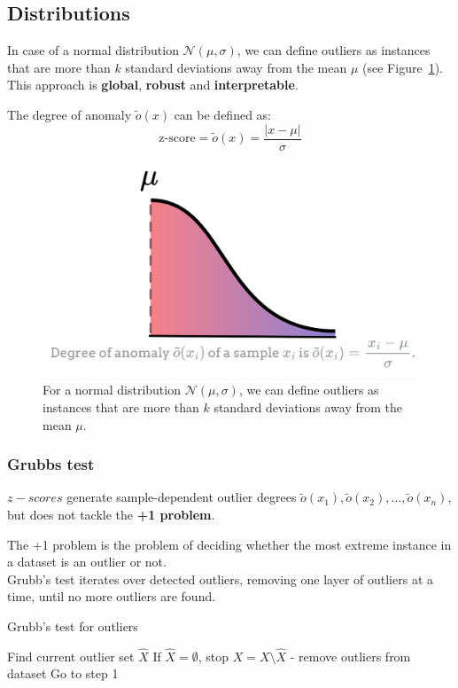 \subsection{Distributions}
\begin{paracol}{2}
   In case of a normal distribution $\mathcal{N}(\mu, \sigma)$, we can define outliers as instances that are more than $k$ standard deviations away from the mean $\mu$ (see Figure~\ref{fig:06/normaldistribution}).\\
   This approach is \textbf{global}, \textbf{robust} and \textbf{interpretable}.

   The degree of anomaly $\tilde{o}(x)$ can be defined as:
   \[
      \text{z-score} = \tilde{o}(x) = \frac{|x - \mu|}{\sigma}
   \]

   \switchcolumn

   \begin{figure}[htbp]
      \centering
      \includegraphics{images/06/normaldistribution.png}
      \caption{For a normal distribution $\mathcal{N}(\mu, \sigma)$, we can define outliers as instances that are more than $k$ standard deviations away from the mean $\mu$.}
      \label{fig:06/normaldistribution}
   \end{figure}
\end{paracol}

\subsubsection{Grubbs test}
$z-scores$ generate sample-dependent outlier degrees $\tilde{o}(x_1), \tilde{o}(x_2), \ldots, \tilde{o}(x_n)$, but does not tackle the \textbf{+1 problem}.

The +1 problem is the problem of deciding whether the most extreme instance in a dataset is an outlier or not.\\
Grubb's test iterates over detected outliers, removing one layer of outliers at a time, until no more outliers are found.
\begin{algorithm}
   \caption{Grubb's test for outliers}
   \begin{algorithmic}[1]
      \State Find current outlier set $\hat{X}$
      \State If $\hat{X} = \emptyset$, stop
      \State $X = X \setminus \hat{X}$ - remove outliers from dataset
      \State Go to step 1
   \end{algorithmic}
\end{algorithm}

